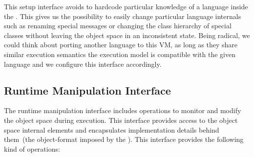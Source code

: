 This \VM setup interface avoids to hardcode particular knowledge of a language inside the \VM. This gives us the possibility to easily change particular language internals such as renaming special messages or changing the class hierarchy of special classes without leaving the object space in an inconsistent state. Being radical, we could think about porting another language to this VM, as long as they share similar execution semantics \ie the \VM execution model is compatible with the given language and we configure this interface accordingly.



\subsection{Runtime Manipulation Interface} 
The runtime manipulation interface includes operations to monitor and modify the object space during execution. This interface provides access to the object space internal elements and encapsulates implementation details behind them~(\ie the object-format imposed by the \VM). This interface provides the following kind of operations:

